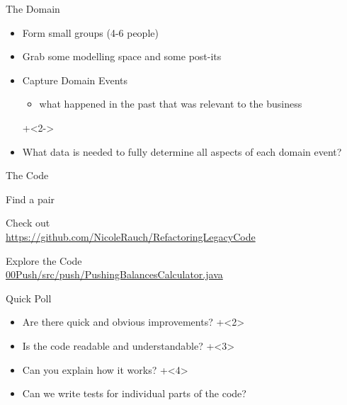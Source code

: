 \begin{frame}[fragile]{The Domain}

\begin{itemize}
\item Form small groups (4-6 people)
\item Grab some modelling space and some post-its
\item Capture Domain Events 
\begin{itemize}
\item what happened in the past that was relevant to the business
\end{itemize}
\onslide+<2->
\item What data is needed to fully determine all aspects of each domain event?
\end{itemize}

\end{frame}


\begin{frame}[fragile]{The Code}

\begin{center}
\Huge
Find a pair
\vspace{2em}

Check out \\
\vspace{1em}
\large
\url{https://github.com/NicoleRauch/RefactoringLegacyCode}

\vspace{2em}
Explore the Code \\
{\large \url{00Push/src/push/PushingBalancesCalculator.java}}
\end{center}

\end{frame}

\begin{frame}[fragile]{Quick Poll}

\begin{itemize}
\onslide+<1>
\item Are there quick and obvious improvements?
\onslide+<2>
\item Is the code readable and understandable?
\onslide+<3>
\item Can you explain how it works?
\onslide+<4>
\item Can we write tests for individual parts of the code?
\end{itemize}

\end{frame}



